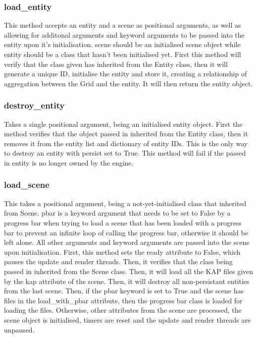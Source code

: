 \documentclass{report}
\begin{document}
\subsubsection{load\_entity}

This method accepts an entity and a scene as positional arguments, as well as allowing for additonal arguments and keyword arguments to be passed into the entity upon it's initialisation. scene should be an initialised scene object while entity should be a class that hasn't been initialised yet. First this method will verify that the class given has inherited from the Entity class, then it will generate a unique ID, initialise the entity and store it, creating a relationship of aggregation between the Grid and the entity. It will then return the entity object.

\subsubsection{destroy\_entity}

Takes a single positional argument, being an initialised entity object. First the method verifies that the object passed in inherited from the Entity class, then it removes it from the entity list and dictionary of entity IDs. This is the only way to destroy an entity with persist set to True. This method will fail if the passed in entity is no longer owned by the engine.

\subsubsection{load\_scene}

This takes a positional argument, being a not-yet-initialised class that inherited from Scene. pbar is a keyword argument that needs to be set to False by a progress bar when trying to load a scene that has been loaded with a progress bar to prevent an infinite loop of calling the progress bar, otherwise it should be left alone. All other arguments and keyword arguments are passed into the scene upon initialisation.
First, this method sets the ready attribute to False, which pauses the update and render threads. Then, it verifies that the class being passed in inherited from the Scene class. Then, it will load all the KAP files given by the kap attribute of the scene. Then, it will destroy all non-persistant entities from the last scene. Then, if the pbar keyword is set to True and the scene has files in the load\_with\_pbar attribute, then the progress bar class is loaded for loading the files. Otherwise, other attributes from the scene are processed, the scene object is initialised, timers are reset and the update and render threads are unpaused.
\end{document}

